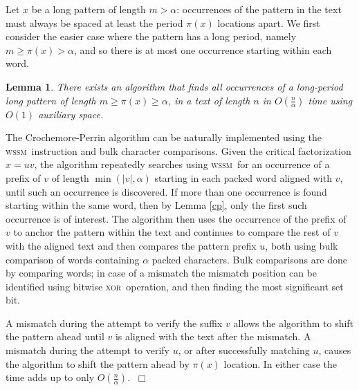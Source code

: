 \documentclass[12pt]{article}
\newtheorem{lemma}[theorem]{Lemma}
\newenvironment{proof}{\noindent{\bf Proof.\/}}{$~\Box$ \newline}
\newcommand{\rem}[1]{{\marginpar{\raggedright\scriptsize #1}}}
\newcommand{\C}{{\alpha}}
\newcommand{\wssm}{\textsc{wssm}}
\newcommand{\xor}{\textsc{xor}}
\begin{document}
\smallskip{}\label{long}
%
Let $x$ be a long pattern of length $m> \C$: 
occurrences of the pattern in the text must always be spaced
at least the period $\pi(x)$ locations apart.
We first consider the easier case where the pattern has a long period,
namely $m \geq \pi(x) > \C$, and so there is at most one occurrence 
starting within each word.

\begin{lemma}
\label{lemma:longer1}
There exists an algorithm that finds all occurrences of a long-period
long pattern of length $m \geq \pi(x) \geq \C$, 
in a text of length $n$ in $O\!\left(\frac{n}{\C}\right)$ time 
using $O(1)$ auxiliary space.
\end{lemma}

\begin{proof}
The Crochemore-Perrin algorithm can be naturally implemented using the 
\wssm\ instruction and bulk character comparisons.
Given the critical factorization $x=uv$, 
the algorithm repeatedly searches using \wssm\ for an occurrence of
a prefix of $v$ of length $\min(|v|,\C)$
starting in each packed word aligned with $v$, until such
an occurrence is discovered.
If more than one occurrence is found starting within the same
word, then by Lemma \ref{cp}, only the first such occurrence is of
interest. %
%
The algorithm then uses the occurrence of the prefix of~$v$ to anchor
the pattern within the text and continues to compare
the rest of $v$ with the aligned text  and then compares the
pattern prefix $u$, both using bulk comparison
of words containing $\C$ packed characters.
Bulk comparisons are done by comparing words; in case of a mismatch
the mismatch position can be identified using bitwise \xor\ operation, and then
finding the most significant set bit.

A mismatch during the attempt to verify the suffix $v$ allows
the algorithm to shift the pattern ahead until $v$ is aligned with the text
after the mismatch. A mismatch during the attempt to verify
$u$, or after successfully matching $u$,
causes the algorithm to shift the pattern ahead by $\pi(x)$ location. 
In either case the time adds up to only $O\!\left(\frac{n}{\C}\right)$.
\end{proof}
\end{document}
